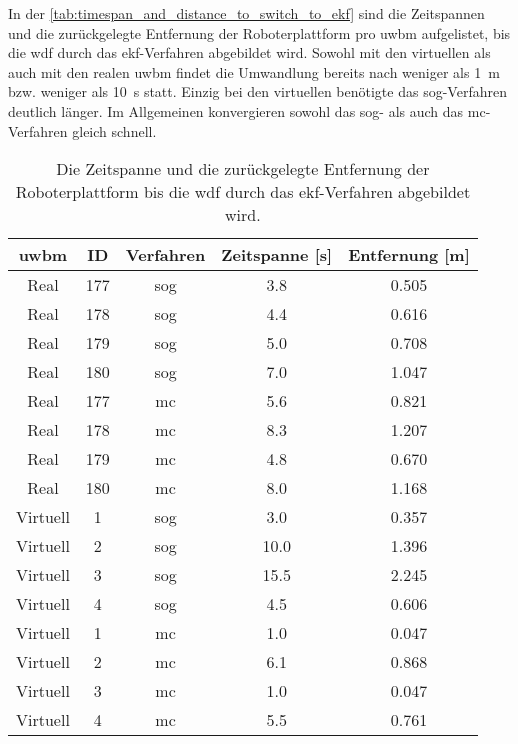 In der \autoref{tab:timespan_and_distance_to_switch_to_ekf} sind die Zeitspannen und die zurückgelegte Entfernung der Roboterplattform pro \gls{uwbm} aufgelistet, bis die \gls{wdf} durch das \gls{ekf}-Verfahren abgebildet wird. Sowohl mit den virtuellen als auch mit den realen \gls{uwbm} findet die Umwandlung bereits nach weniger als \SI{1}{\meter} bzw. weniger als \SI{10}{\second} statt. Einzig bei den virtuellen  benötigte das \gls{sog}-Verfahren deutlich länger. Im Allgemeinen konvergieren sowohl das \gls{sog}- als auch das \gls{mc}-Verfahren gleich schnell.

\begin{table}
	\centering
	\begin{tabular}{||c|c||c||c|c||}
		\hline
\gls{uwbm} & ID & Verfahren & Zeitspanne [\si{\second}] & Entfernung [\si{\meter}] \\
\hline
Real & \num{177} & \gls{sog} & \num{3.8} & \num{0.505} \\
Real & \num{178} & \gls{sog} & \num{4.4} & \num{0.616} \\
Real & \num{179} & \gls{sog} & \num{5.0} & \num{0.708} \\
Real & \num{180} & \gls{sog} & \num{7.0} & \num{1.047} \\
\hline
\hline
Real & \num{177} & \gls{mc} & \num{5.6} & \num{0.821} \\
Real & \num{178} & \gls{mc} & \num{8.3} & \num{1.207} \\
Real & \num{179} & \gls{mc} & \num{4.8} & \num{0.670} \\
Real & \num{180} & \gls{mc} & \num{8.0} & \num{1.168} \\
\hline
\hline
Virtuell & \num{1} & \gls{sog} & \num{3.0} & \num{0.357} \\
Virtuell & \num{2} & \gls{sog} & \num{10.0} & \num{1.396} \\
Virtuell & \num{3} & \gls{sog} & \num{15.5} & \num{2.245} \\
Virtuell & \num{4} & \gls{sog} & \num{4.5} & \num{0.606} \\
\hline
\hline
Virtuell & \num{1} & \gls{mc} & \num{1.0} & \num{0.047} \\
Virtuell & \num{2} & \gls{mc} & \num{6.1} & \num{0.868} \\
Virtuell & \num{3} & \gls{mc} & \num{1.0} & \num{0.047} \\
Virtuell & \num{4} & \gls{mc} & \num{5.5} & \num{0.761} \\
\hline
	\end{tabular}
	\caption{Die Zeitspanne und die zurückgelegte Entfernung der Roboterplattform bis die \gls{wdf} durch das \gls{ekf}-Verfahren abgebildet wird.}
	\label{tab:timespan_and_distance_to_switch_to_ekf}
\end{table}
